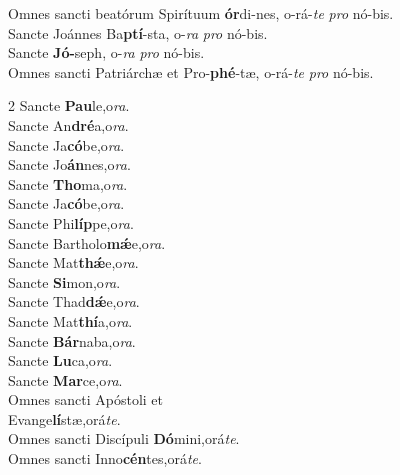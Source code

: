 \begin{nstabbing}
\>Omnes \quad sancti \quad beatórum Spirítuum \>\>\>\>\>\textbf{ór}di-nes, \>\>o-\>rá-\>\textit{te} \>\textit{pro} \>nó-\>bis.\\
\>Sancte \>Joánnes \>\>Ba\>\textbf{ptí}-\>\>sta, \>\>o-\>\textit{ra} \>\textit{pro} \>nó-\>bis.\\
\>Sancte \>\>\>\>\>\textbf{Jó-}\>seph, \>\>o-\>\textit{ra} \>\textit{pro} \>nó-\>bis.\\
\>Omnes \>sancti \>Patriárchæ et \quad \>Pro-\>\>\textbf{phé}-\>tæ, \>o-\>rá-\>\textit{te} \>\textit{pro} \>nó-\>bis.\\
\end{nstabbing}
\begin{multicols}{2}
\noindent
San\-cte \textbf{Pau}le,\hfill o\textit{ra}.\\
San\-cte An\textbf{dré}a,\hfill o\textit{ra}.\\
San\-cte Ja\textbf{có}be,\hfill o\textit{ra}.\\
San\-cte Jo\textbf{án}nes,\hfill o\textit{ra}.\\
San\-cte \textbf{Tho}ma,\hfill o\textit{ra}.\\
San\-cte Ja\textbf{có}be,\hfill o\textit{ra}.\\
San\-cte Phi\textbf{líp}pe,\hfill o\textit{ra}.\\
San\-cte Bartholo\textbf{mǽ}e,\hfill o\textit{ra}.\\
San\-cte Mat\textbf{thǽ}e,\hfill o\textit{ra}.\\
San\-cte \textbf{Si}mon,\hfill o\textit{ra}.\\
San\-cte Thad\textbf{dǽ}e,\hfill o\textit{ra}.\\
San\-cte Mat\textbf{thí}a,\hfill o\textit{ra}.\\
San\-cte \textbf{Bár}naba,\hfill o\textit{ra}.\\
San\-cte \textbf{Lu}ca,\hfill o\textit{ra}.\\
San\-cte \textbf{Mar}ce,\hfill o\textit{ra}.\\
Omnes san\-cti Apóstoli et \\ \emspace Evange\textbf{lí}stæ,\hfill orá\textit{te}.\\
Omnes san\-cti Discípuli \textbf{Dó}mini,\hfill orá\textit{te}.\\
Omnes san\-cti Inno\textbf{cén}tes,\hfill orá\textit{te}.\\

\end{multicols}
